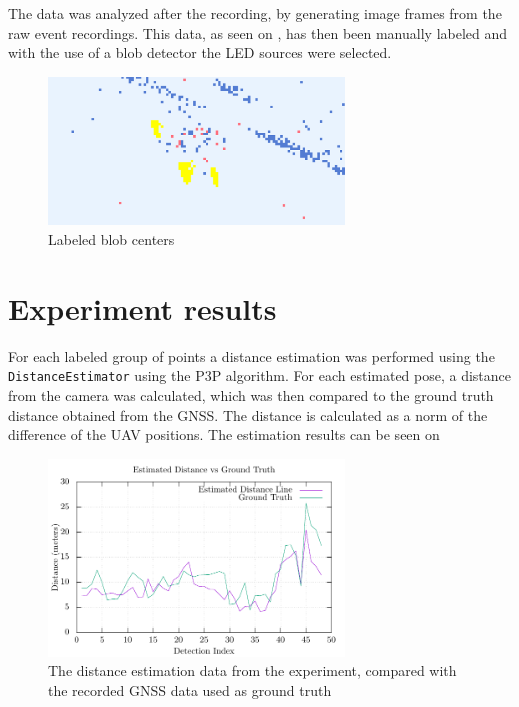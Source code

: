 The data was analyzed after the recording, by generating image frames from the raw event recordings. This data,
as seen on , has then been manually labeled and with the use of a blob detector the \ac{LED} sources
were selected.

\begin{figure}[H]
	\centering
	\includegraphics[width=0.7\textwidth]{./fig/photos/labeled_2.png}
	\caption{Labeled blob centers}
	\label{fig:labeled}
\end{figure}

\section{Experiment results}

For each labeled group of points a distance estimation was performed using the \texttt{DistanceEstimator} using the
\ac{P3P} algorithm. For each estimated pose, a distance from the camera was calculated, which was then compared to the
ground truth distance obtained from the \ac{GNSS}. The distance is calculated as a norm of the difference of the \ac{UAV} positions. 
The estimation
results can be seen on 

\begin{figure}[H]
	\centering
	\includegraphics[width=0.7\textwidth]{./fig/tikz/experiment_analysis.pdf}
	\caption{The distance estimation data from the experiment, compared with the recorded GNSS data used as ground truth}
	\label{fig:experiment_results}
\end{figure}

